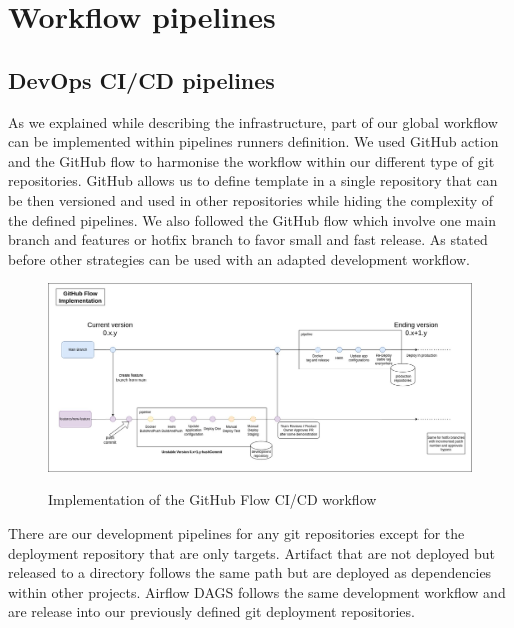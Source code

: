 \section{Workflow pipelines}\label{sec:workflow}

\subsection{DevOps CI/CD pipelines}\label{subsec:ci/cd-pipelines-and-development-workflow}
As we explained while describing the infrastructure, part of our global workflow can be implemented within pipelines runners definition.
We used GitHub action and the GitHub flow to harmonise the workflow within our different type of git repositories.
GitHub allows us to define template in a single repository that can be then versioned and used in other repositories while hiding the complexity of the defined pipelines.
We also followed the GitHub flow which involve one main branch and features or hotfix branch to favor small and fast release.
As stated before other strategies can be used with an adapted development workflow.

\begin{figure}[!htbp]
    \centering
    \caption{Implementation of the GitHub Flow CI/CD workflow}
    \includegraphics[scale=0.3]{images/project/cicd-workflow-p1}
    \label{fig:icd-workflow-p1}
\end{figure}

There are our development pipelines for any git repositories except for the deployment repository that are only targets.
Artifact that are not deployed but released to a directory follows the same path but are deployed as dependencies within other projects.
Airflow DAGS follows the same development workflow and are release into our previously defined git deployment repositories.

